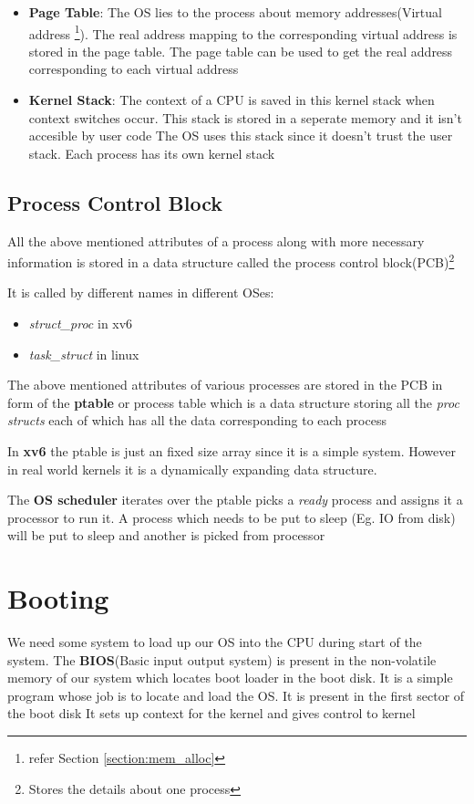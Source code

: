 \documentclass[12pt]{article}
\begin{document}
\begin{itemize}[topsep=0pt, partopsep=0pt, itemsep=0pt, parsep=0pt]
        \item \textbf{Page Table}: The OS lies to the process about memory addresses(Virtual address \footnote{refer Section \ref{section:mem_alloc}}). The real address mapping to the corresponding
        virtual address is stored in the page table. The page table can be used to get the real address corresponding to each virtual address
        \item \textbf{Kernel Stack}: The context of a CPU is saved in this kernel stack when context switches occur. This stack is stored in a seperate memory and it isn't accesible by user code
        The OS uses this stack since it doesn't trust the user stack. Each process has its own kernel stack
    \end{itemize}


    \subsection{Process Control Block}
    All the above mentioned attributes of a process along with more necessary information
    is stored in a data structure called the process control block(PCB)\footnote{Stores the details about one process}


    It is called by different names in different OSes:
    \begin{itemize}[topsep=0pt, partopsep=0pt, itemsep=0pt, parsep=0pt]
        \item \textit{struct\_proc} in xv6
        \item \textit{task\_struct} in linux
    \end{itemize}


    The above mentioned attributes of various processes are stored in the PCB 
    in form of the \textbf{ptable} or process table which is a data structure storing all the 
    \textit{proc structs} each of which has all the data corresponding to each process

    In \textbf{xv6} the ptable is just an fixed size array since it is a simple system. However in real
    world kernels it is a dynamically expanding data structure. 

    
    The \textbf{OS scheduler} iterates over the ptable picks a \textit{ready} process and assigns it a processor to run it.
    A process which needs to be put to sleep (Eg. IO from disk) will be put to sleep and another is picked from processor
 
    \section{Booting}
    We need some system to load up our OS into the CPU during start of the system.
    The \textbf{BIOS}(Basic input output system) is present in the non-volatile memory of our system which locates boot loader 
    in the boot disk. It is a simple program whose job is to locate and load the OS. It is present in the first sector of the boot disk
    It sets up context for the kernel and gives control to kernel
\end{document}

